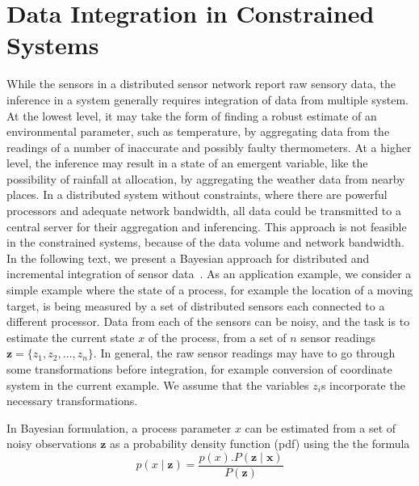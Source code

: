 \section{Data Integration in Constrained Systems}
\label{sec:knowledge:constrained}

 
While the sensors in a distributed sensor network report raw sensory data, the inference in a system generally requires integration
of data from multiple system. At the lowest level, it may take the form of finding a robust estimate of an environmental parameter,
such as temperature, by aggregating data from the readings of a number of inaccurate and possibly faulty thermometers. At a higher
level, the inference may result in a state of an emergent variable, like the possibility of rainfall at allocation, by aggregating the 
weather data from nearby places. In a distributed system without constraints, where there are powerful processors and adequate network 
bandwidth, all data could be transmitted to a central server for their aggregation and inferencing. This approach is not feasible in 
the constrained systems, because of the data volume and network bandwidth. 
%
In the following text, we present a Bayesian approach for distributed and incremental integration of sensor data~\citep{Makareno:2009}. 
As an application example, we consider a simple example where the state of a process, for example the location of a moving target, is 
being measured by a set of distributed sensors each connected to a different processor. Data from each of the sensors can be noisy, and 
the task is to estimate the current state $x$ of the process, from a set of $n$ sensor readings $\mathbf{z} = \{ z_1, z_2, \dots, 
z_n \}$. In general, the raw sensor readings may have to go through some transformations before integration, for example 
conversion of coordinate system in the current example. We assume that the variables $z_i$s incorporate the necessary transformations.

In Bayesian formulation, a process parameter $x$ can be estimated from a set of noisy observations $\mathbf{z}$ as a probability density
function (pdf) using the the formula
\begin{equation}
	p( x \mid \mathbf{z} ) = \frac{p(x).P(\mathbf{z \mid x})}{P(\mathbf{z})}
	\label{eqn:knowledge:bayesian1}
\end{equation}

